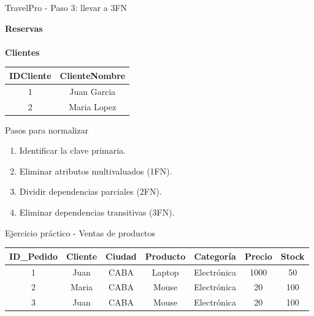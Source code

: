 \documentclass{beamer}
\begin{document}
\begin{frame}{TravelPro - Paso 3: llevar a 3FN}
    \begin{center}
    \textbf{Reservas}\\[0.1cm]
    \vspace{0.6cm}
    \textbf{\\Clientes}\\[0.1cm]
    \begin{tabular}{cc}
        \hline
        IDCliente & ClienteNombre \\
        \hline
        1 & Juan Garcia \\
        2 & Maria Lopez \\
        \hline
    \end{tabular}
    \end{center}
\end{frame}

\begin{frame}{Pasos para normalizar}
    \begin{enumerate}
        \item Identificar la clave primaria.
        \item Eliminar atributos multivaluados (1FN).
        \item Dividir dependencias parciales (2FN).
        \item Eliminar dependencias transitivas (3FN).
    \end{enumerate}
\end{frame}

\begin{frame}{Ejercicio práctico - Ventas de productos}
    \small
    \begin{center}
    \begin{tabular}{ccccccc}
        \hline
        ID\_Pedido & Cliente & Ciudad & Producto & Categoría & Precio & Stock \\
        \hline
        1 & Juan & CABA & Laptop & Electrónica & 1000 & 50 \\
        2 & Maria & CABA & Mouse & Electrónica & 20 & 100 \\
        3 & Juan & CABA & Mouse & Electrónica & 20 & 100 \\
        \hline
    \end{tabular}
    \end{center}
\end{frame}
\end{document}
